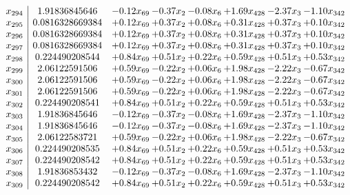\documentclass[8pt]{article}
\begin{document}
\[\begin{array}{c| c c@{\hskip 2pt} c@{\hskip 2pt} c@{\hskip 2pt} c@{\hskip 2pt} c@{\hskip 2pt} c@{\hskip 2pt} }
 x_{294}   &  1.91836845646 & -0.12 x_{69} & -0.37 x_{2} & -0.08 x_{6} & +  1.69 x_{428} & -2.37 x_{3} & -1.10 x_{342}\\
 x_{295}   &  0.0816328669384 & +  0.12 x_{69} & +  0.37 x_{2} & +  0.08 x_{6} & +  0.31 x_{428} & +  0.37 x_{3} & +  0.10 x_{342}\\
 x_{296}   &  0.0816328669384 & +  0.12 x_{69} & +  0.37 x_{2} & +  0.08 x_{6} & +  0.31 x_{428} & +  0.37 x_{3} & +  0.10 x_{342}\\
 x_{297}   &  0.0816328669384 & +  0.12 x_{69} & +  0.37 x_{2} & +  0.08 x_{6} & +  0.31 x_{428} & +  0.37 x_{3} & +  0.10 x_{342}\\
 x_{298}   &  0.224490208544 & +  0.84 x_{69} & +  0.51 x_{2} & +  0.22 x_{6} & +  0.59 x_{428} & +  0.51 x_{3} & +  0.53 x_{342}\\
 x_{299}   &  2.06122591506 & +  0.59 x_{69} & -0.22 x_{2} & +  0.06 x_{6} & +  1.98 x_{428} & -2.22 x_{3} & -0.67 x_{342}\\
 x_{300}   &  2.06122591506 & +  0.59 x_{69} & -0.22 x_{2} & +  0.06 x_{6} & +  1.98 x_{428} & -2.22 x_{3} & -0.67 x_{342}\\
 x_{301}   &  2.06122591506 & +  0.59 x_{69} & -0.22 x_{2} & +  0.06 x_{6} & +  1.98 x_{428} & -2.22 x_{3} & -0.67 x_{342}\\
 x_{302}   &  0.224490208541 & +  0.84 x_{69} & +  0.51 x_{2} & +  0.22 x_{6} & +  0.59 x_{428} & +  0.51 x_{3} & +  0.53 x_{342}\\
 x_{303}   &  1.91836845646 & -0.12 x_{69} & -0.37 x_{2} & -0.08 x_{6} & +  1.69 x_{428} & -2.37 x_{3} & -1.10 x_{342}\\
 x_{304}   &  1.91836845646 & -0.12 x_{69} & -0.37 x_{2} & -0.08 x_{6} & +  1.69 x_{428} & -2.37 x_{3} & -1.10 x_{342}\\
 x_{305}   &  2.06122583721 & +  0.59 x_{69} & -0.22 x_{2} & +  0.06 x_{6} & +  1.98 x_{428} & -2.22 x_{3} & -0.67 x_{342}\\
 x_{306}   &  0.224490208535 & +  0.84 x_{69} & +  0.51 x_{2} & +  0.22 x_{6} & +  0.59 x_{428} & +  0.51 x_{3} & +  0.53 x_{342}\\
 x_{307}   &  0.224490208542 & +  0.84 x_{69} & +  0.51 x_{2} & +  0.22 x_{6} & +  0.59 x_{428} & +  0.51 x_{3} & +  0.53 x_{342}\\
 x_{308}   &  1.91836853432 & -0.12 x_{69} & -0.37 x_{2} & -0.08 x_{6} & +  1.69 x_{428} & -2.37 x_{3} & -1.10 x_{342}\\
 x_{309}   &  0.224490208542 & +  0.84 x_{69} & +  0.51 x_{2} & +  0.22 x_{6} & +  0.59 x_{428} & +  0.51 x_{3} & +  0.53 x_{342}\\

\end{array}\]
\end{document}
